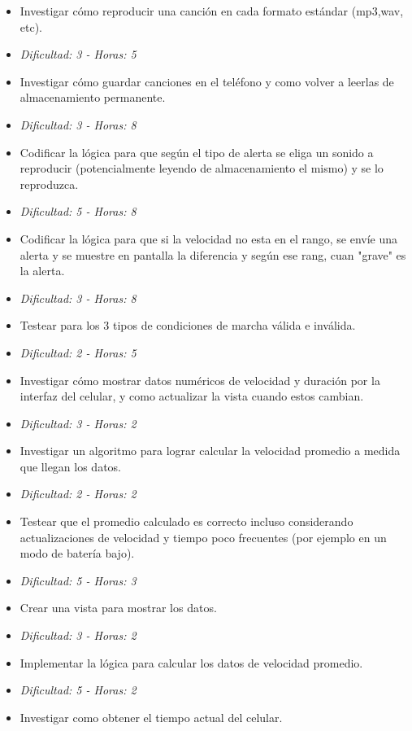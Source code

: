 \documentclass[10pt, a4paper,english,spanish]{article}
\begin{document}
\begin{itemize}
	\itemsep 0em
	\item Investigar cómo reproducir una canción en cada formato estándar (mp3,wav, etc).
	\item[] \hfill \textit{Dificultad: 3 - Horas: 5}
	\item Investigar cómo guardar canciones en el teléfono y como volver a leerlas de almacenamiento permanente.
	\item[] \hfill \textit{Dificultad: 3 - Horas: 8}
	\item Codificar la lógica para que según el tipo de alerta se eliga un sonido a reproducir (potencialmente leyendo de almacenamiento el mismo) y se lo reproduzca. 
	\item[] \hfill \textit{Dificultad: 5 - Horas: 8}
	\item Codificar la lógica para que si la velocidad no esta en el rango, se envíe una alerta y se muestre en pantalla la diferencia y según ese rang, cuan "grave" es la alerta.
	\item[] \hfill \textit{Dificultad: 3 - Horas: 8}
	\item Testear para los 3 tipos de condiciones de marcha válida e inválida.
	\item[] \hfill \textit{Dificultad: 2 - Horas: 5}
	\item Investigar cómo mostrar datos numéricos de velocidad y duración por la interfaz del celular, y como actualizar la vista cuando estos cambian.
	\item[] \hfill \textit{Dificultad: 3 - Horas: 2}
	\item Investigar un algoritmo para lograr calcular la velocidad promedio a medida que llegan los datos.
	\item[] \hfill \textit{Dificultad: 2 - Horas: 2}
	\item Testear que el promedio calculado es correcto incluso considerando actualizaciones de velocidad y tiempo poco frecuentes 
		(por ejemplo en un modo de batería bajo).
	\item[] \hfill \textit{Dificultad: 5 - Horas: 3}
	\item Crear una vista para mostrar los datos.
	\item[] \hfill \textit{Dificultad: 3 - Horas: 2}
	\item Implementar la lógica para calcular los datos de velocidad promedio.
	\item[] \hfill \textit{Dificultad: 5 - Horas: 2}
	\item  Investigar como obtener el tiempo actual del celular.

\end{itemize}
\end{document}
